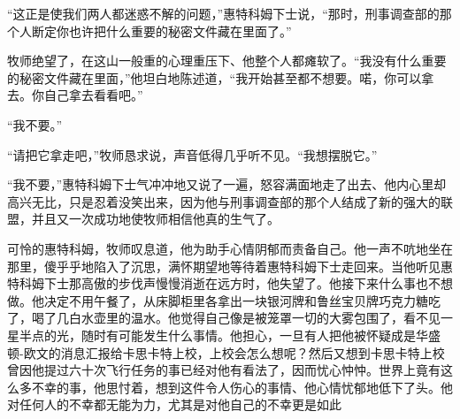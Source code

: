     “这正是使我们两人都迷惑不解的问题，”惠特科姆下士说，“那时，刑事调查部的那个人断定你也许把什么重要的秘密文件藏在里面了。”

    牧师绝望了，在这山一般重的心理重压下、他整个人都瘫软了。“我没有什么重要的秘密文件藏在里面，”他坦白地陈述道，“我开始甚至都不想要。喏，你可以拿去。你自己拿去看看吧。”

    “我不要。”

    “请把它拿走吧，”牧师恳求说，声音低得几乎听不见。“我想摆脱它。”

    “我不要，”惠特科姆下士气冲冲地又说了一遍，怒容满面地走了出去、他内心里却高兴无比，只是忍着没笑出来，因为他与刑事调查部的那个人结成了新的强大的联盟，并且又一次成功地使牧师相信他真的生气了。

    可怜的惠特科姆，牧师叹息道，他为助手心情阴郁而责备自己。他一声不吭地坐在那里，傻乎乎地陷入了沉思，满怀期望地等待着惠特科姆下士走回来。当他听见惠特科姆下士那高傲的步伐声慢慢消逝在远方时，他失望了。他接下来什么事也不想做。他决定不用午餐了，从床脚柜里各拿出一块银河牌和鲁丝宝贝牌巧克力糖吃了，喝了几白水壶里的温水。他觉得自己像是被笼罩一切的大雾包围了，看不见一星半点的光，随时有可能发生什么事情。他担心，一旦有人把他被怀疑成是华盛顿-欧文的消息汇报给卡思卡特上校，上校会怎么想呢？然后又想到卡思卡特上校曾因他提过六十次飞行任务的事已经对他有看法了，因而忧心忡忡。世界上竟有这么多不幸的事，他思忖着，想到这件令人伤心的事情、他心情忧郁地低下了头。他对任何人的不幸都无能为力，尤其是对他自己的不幸更是如此
